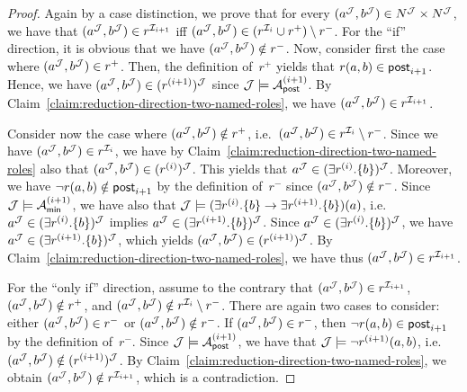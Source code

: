 \begin{proof}
    \noindent
    Again by a case distinction, we prove that for every
    $(a^\mathcal{J},b^\mathcal{J})\in N^\mathcal{J}\times N^\mathcal{J}$, we have that
    $(a^\mathcal{J},b^\mathcal{J})\in r^{\mathcal{I}_{i+1}}$ iff
    $(a^\mathcal{J},b^\mathcal{J})\in(r^{\mathcal{I}_i}\cup r^+)\setminus r^-$.
    For the \enquote{if} direction, it is obvious that we have
    $(a^\mathcal{J},b^\mathcal{J})\notin r^-$.
    Now, consider first the case where $(a^\mathcal{J},b^\mathcal{J})\in r^+$.  Then, the
    definition of~$r^+$ yields that $r(a,b)\in\mathsf{post}_{i+1}$.  Hence, we have
    $(a^\mathcal{J},b^\mathcal{J})\in(r^{(i+1)})^\mathcal{J}$ since $\mathcal{J}\models\mathcal{A}_\mathsf{post}^{(i+1)}$.  By
    Claim~\ref{claim:reduction-direction-two-named-roles}, we have
    $(a^\mathcal{J},b^\mathcal{J})\in r^{\mathcal{I}_{i+1}}$.

    Consider now the case where $(a^\mathcal{J},b^\mathcal{J})\notin r^+$,
    i.e.~$(a^\mathcal{J},b^\mathcal{J})\in r^{\mathcal{I}_i}\setminus r^-$.  Since we have
    $(a^\mathcal{J},b^\mathcal{J})\in r^{\mathcal{I}_i}$, we have by
    Claim~\ref{claim:reduction-direction-two-named-roles} also that
    $(a^\mathcal{J},b^\mathcal{J})\in(r^{(i)})^\mathcal{J}$.  This yields that
    $a^\mathcal{J}\in(\exists r^{(i)}.\{b\})^\mathcal{J}$.  Moreover, we have
    $\lnot r(a,b)\notin\mathsf{post}_{i+1}$ by the definition of~$r^-$ since
    $(a^\mathcal{J},b^\mathcal{J})\notin r^-$.  Since $\mathcal{J}\models\mathcal{A}_\mathsf{min}^{(i+1)}$, we have also
    that $\mathcal{J}\models(\exists r^{(i)}.\{b\}\to\exists r^{(i+1)}.\{b\})(a)$,
    i.e.~$a^\mathcal{J}\in(\exists r^{(i)}.\{b\})^\mathcal{J}$ implies
    $a^\mathcal{J}\in(\exists r^{(i+1)}.\{b\})^\mathcal{J}$.  Since
    $a^\mathcal{J}\in(\exists r^{(i)}.\{b\})^\mathcal{J}$, we have
    $a^\mathcal{J}\in(\exists r^{(i+1)}.\{b\})^\mathcal{J}$, which yields
    $(a^\mathcal{J},b^\mathcal{J})\in(r^{(i+1)})^\mathcal{J}$.  By
    Claim~\ref{claim:reduction-direction-two-named-roles}, we have thus
    $(a^\mathcal{J},b^\mathcal{J})\in r^{\mathcal{I}_{i+1}}$.

    For the \enquote{only if} direction, assume to the contrary that
    $(a^\mathcal{J},b^\mathcal{J})\in r^{\mathcal{I}_{i+1}}$, $(a^\mathcal{J},b^\mathcal{J})\notin r^+$, and
    $(a^\mathcal{J},b^\mathcal{J})\notin r^{\mathcal{I}_i}\setminus r^-$.  There are again two cases
    to consider: either $(a^\mathcal{J},b^\mathcal{J})\in r^-$ or $(a^\mathcal{J},b^\mathcal{J})\notin r^-$.
    If $(a^\mathcal{J},b^\mathcal{J})\in r^-$, then $\lnot r(a,b)\in\mathsf{post}_{i+1}$ by the
    definition of~$r^-$.  Since $\mathcal{J}\models\mathcal{A}_\mathsf{post}^{(i+1)}$, we have that
    $\mathcal{J}\models\lnot r^{(i+1)}(a,b)$,
    i.e.~$(a^\mathcal{J},b^\mathcal{J})\notin(r^{(i+1)})^\mathcal{J}$.  By
    Claim~\ref{claim:reduction-direction-two-named-roles}, we obtain
    $(a^\mathcal{J},b^\mathcal{J})\notin r^{\mathcal{I}_{i+1}}$, which is a contradiction.


\end{proof}
